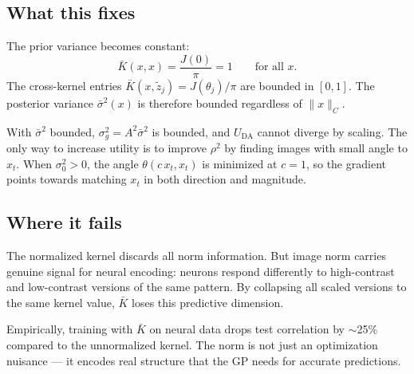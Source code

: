 \documentclass[11pt]{article}
\begin{document}
\subsection*{What this fixes}

The prior variance becomes constant:
\begin{equation}
    \bar K(x, x) = \frac{J(0)}{\pi} = 1
    \qquad\text{for all $x$.}
\end{equation}
The cross-kernel entries $\bar K(x, \tilde z_j) = J(\theta_j)/\pi$
are bounded in $[0, 1]$. The posterior variance $\bar\sigma^2(x)$
is therefore bounded regardless of $\|x\|_C$.

With $\bar\sigma^2$ bounded, $\sigma^2_g = A^2\bar\sigma^2$ is
bounded, and $U_{\mathrm{DA}}$ cannot diverge by scaling.
The only way to increase utility is to improve $\rho^2$ by finding
images with small angle to $x_t$. When $\sigma_0^2 > 0$, the angle
$\theta(c\,x_t, x_t)$ is minimized at $c = 1$, so the gradient
points towards matching $x_t$ in both direction and magnitude.

\subsection*{Where it fails}

The normalized kernel discards all norm information. But image
norm carries genuine signal for neural encoding: neurons respond
differently to high-contrast and low-contrast versions of the
same pattern. By collapsing all scaled versions to the same
kernel value, $\bar K$ loses this predictive dimension.

Empirically, training with $\bar K$ on neural data drops test
correlation by $\sim$25\% compared to the unnormalized kernel.
The norm is not just an optimization nuisance --- it encodes
real structure that the GP needs for accurate predictions.
\end{document}
